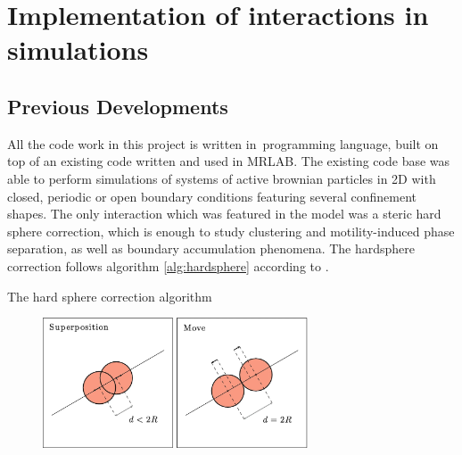 \documentclass[../master_thesis_np.tex]{subfiles}
\begin{document}
\chapter[Interaction Implementation]{Implementation of interactions in simulations}
	\section{Previous Developments}
	All the code work in this project is written in\ \julia programming language, built on top of an existing code written and used in {\color{blue} MRLAB}. The existing code base was able to perform simulations of systems of active brownian particles in 2D with closed, periodic or open boundary conditions featuring several confinement shapes. The only interaction which was featured in the model was a steric hard sphere correction, which is enough to study clustering and motility-induced phase  separation, as well as boundary accumulation phenomena. The hardsphere correction follows algorithm \ref{alg:hardsphere} according to \parencite{callegari_numerical_2019}.
	\parencite{martin-gomez_collective_2018}

	\begin{algorithm}[htp]
		\caption{The hard sphere correction algorithm} \label{alg:hardsphere}	
		\begin{algorithmic}[1]
			 

			\EndIf
			\EndFor
		\end{algorithmic}
		\end{algorithm}

		\begin{figure}[htp]
			\centering
			\includegraphics[width = 0.7\textwidth]{callegari_volpe_2019_hardsphere.png}
			\label{fig:hardsphere}
			\caption{{\small {}}}
		\end{figure}
\end{document}
